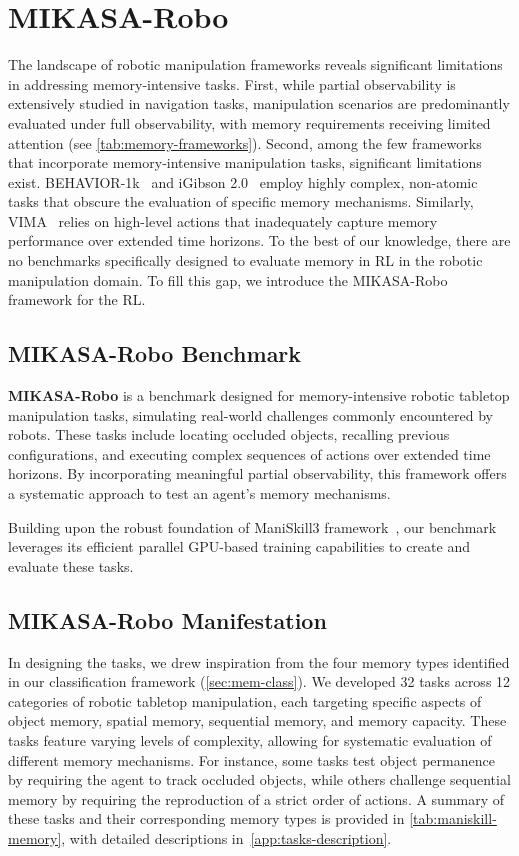 \section{MIKASA-Robo}
\label{sec:maniskill-memory}
The landscape of robotic manipulation frameworks reveals significant limitations in addressing memory-intensive tasks. First, while partial observability is extensively studied in navigation tasks, 
manipulation scenarios are predominantly evaluated under full observability, with memory requirements receiving limited attention (see \autoref{tab:memory-frameworks}). Second, among the few frameworks that incorporate memory-intensive manipulation tasks, significant limitations exist. BEHAVIOR-1k~\citep{li2024behavior} and iGibson 2.0~\citep{li2022igibson} employ highly complex, non-atomic tasks that obscure the evaluation of specific memory mechanisms. Similarly, VIMA~\citep{jiang2022vima} relies on high-level actions that inadequately capture memory performance over extended time horizons. To the best of our knowledge, there are no benchmarks specifically designed to evaluate memory in RL in the robotic manipulation domain. To fill this gap, we introduce the MIKASA-Robo framework for the RL.


\subsection{MIKASA-Robo Benchmark}
\textbf{MIKASA-Robo} is a benchmark designed for memory-intensive robotic tabletop manipulation tasks, simulating real-world challenges commonly encountered by robots. These tasks include locating occluded objects, recalling previous configurations, and executing complex sequences of actions over extended time horizons. By incorporating meaningful partial observability, this framework offers a systematic approach to test an agent’s memory mechanisms.

Building upon the robust foundation of ManiSkill3 framework~\citep{tao2024maniskill3}, our benchmark leverages its efficient parallel GPU-based training capabilities to create and evaluate these tasks.


\subsection{MIKASA-Robo Manifestation}
In designing the tasks, we drew inspiration from the four memory types identified in our classification framework (\autoref{sec:mem-class}). We developed 32 tasks across 12 categories of robotic tabletop manipulation, each targeting specific aspects of object memory, spatial memory, sequential memory, and memory capacity. These tasks feature varying levels of complexity, allowing for systematic evaluation of different memory mechanisms. For instance, some tasks test object permanence by requiring the agent to track occluded objects, while others challenge sequential memory by requiring the reproduction of a strict order of actions. A summary of these tasks and their corresponding memory types is provided in \autoref{tab:maniskill-memory}, with detailed descriptions in~\autoref{app:tasks-description}.

